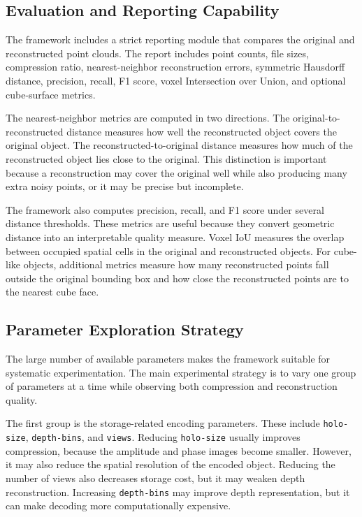 \documentclass{article}
\begin{document}
\begin{normalsize}
\subsection{Evaluation and Reporting Capability}

The framework includes a strict reporting module that compares the original and reconstructed point clouds. The report includes point counts, file sizes, compression ratio, nearest-neighbor reconstruction errors, symmetric Hausdorff distance, precision, recall, F1 score, voxel Intersection over Union, and optional cube-surface metrics.

The nearest-neighbor metrics are computed in two directions. The original-to-reconstructed distance measures how well the reconstructed object covers the original object. The reconstructed-to-original distance measures how much of the reconstructed object lies close to the original. This distinction is important because a reconstruction may cover the original well while also producing many extra noisy points, or it may be precise but incomplete.

The framework also computes precision, recall, and F1 score under several distance thresholds. These metrics are useful because they convert geometric distance into an interpretable quality measure. Voxel IoU measures the overlap between occupied spatial cells in the original and reconstructed objects. For cube-like objects, additional metrics measure how many reconstructed points fall outside the original bounding box and how close the reconstructed points are to the nearest cube face.

\subsection{Parameter Exploration Strategy}

The large number of available parameters makes the framework suitable for systematic experimentation. The main experimental strategy is to vary one group of parameters at a time while observing both compression and reconstruction quality.

The first group is the storage-related encoding parameters. These include \texttt{holo-size}, \texttt{depth-bins}, and \texttt{views}. Reducing \texttt{holo-size} usually improves compression, because the amplitude and phase images become smaller. However, it may also reduce the spatial resolution of the encoded object. Reducing the number of views also decreases storage cost, but it may weaken depth reconstruction. Increasing \texttt{depth-bins} may improve depth representation, but it can make decoding more computationally expensive.


\end{normalsize}
\end{document}
